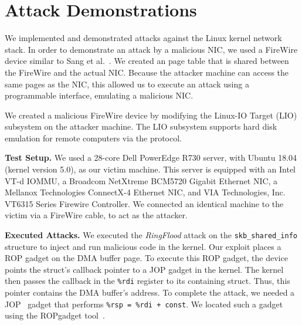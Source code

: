 \section{Attack Demonstrations}\label{Sec:setup}


We implemented and demonstrated \compound attacks against the Linux kernel network stack. 
In order to demonstrate an attack by a malicious NIC, we used a FireWire device similar to Sang et al.~\cite{SLND10}. We created an \iova{} page table that is shared between the FireWire and the actual NIC. Because the attacker machine can access the same pages as the NIC, this allowed us to execute an attack using a programmable interface, emulating a malicious NIC.


We created a malicious FireWire device by modifying the Linux-IO Target (LIO) subsystem on the attacker machine. The LIO subsystem supports hard disk emulation for remote computers via the \spb{} protocol. 

\smallskip
\noindent\textbf{Test Setup.}
We used a 28-core Dell PowerEdge R730 server, with Ubuntu 18.04 (kernel version 5.0), as our victim machine. This server is equipped with an Intel VT-d IOMMU, a Broadcom NetXtreme BCM5720 Gigabit Ethernet NIC, a Mellanox Technologies ConnectX-4 Ethernet NIC, and VIA Technologies, Inc. VT6315 Series Firewire Controller. We connected an identical machine to the victim via a FireWire cable, to act as the attacker. 

\smallskip
\noindent\textbf{Executed Attacks.}
We executed the \textit{RingFlood} attack on the \texttt{skb\_shared\_info} structure to inject and run malicious code in the kernel.
Our exploit places a ROP gadget on the DMA buffer page. To execute this ROP gadget, the device points the struct's callback pointer to a JOP gadget in the kernel. The kernel then passes the callback in the \texttt{\%rdi} register to its containing struct. Thus, this pointer contains the DMA buffer's address. 
To complete the attack, we needed a JOP~\cite{BJFL11} gadget that performs \texttt{\%rsp = \%rdi + const}. We located such a gadget using the ROPgadget tool~\cite{ROPgadget}.

